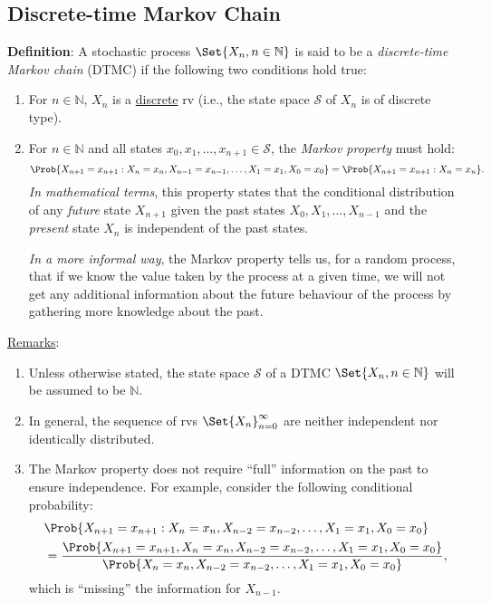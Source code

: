 \subsection*{Discrete-time Markov Chain}
\begin{Regular}
    \textbf{Definition}: A stochastic process $ \Set{X_n,n\in\mathbb{N}} $ is said to be a
    \emph{discrete-time Markov chain} (DTMC) if the following two conditions hold true:
    \begin{enumerate}[(1)]
        \item For $ n\in\mathbb{N} $, $ X_n $ is a \underline{discrete} rv (i.e., the state space $ \mathcal{S} $ of $ X_n $ is of discrete type).
        \item For $ n\in\mathbb{N} $ and all states $ x_0,x_1,\ldots,x_{n+1}\in\mathcal{S} $, the \emph{Markov property} must hold:
              \[ \Prob{X_{n+1}=x_{n+1}\given X_n=x_n,X_{n-1}=x_{n-1},\ldots,X_1=x_1,X_0=x_0}=\Prob{X_{n+1}=x_{n+1}\given X_n=x_n}. \]
              \emph{In mathematical terms}, this property states that the conditional distribution of any \emph{future}
              state $ X_{n+1} $ given the past states $ X_0,X_1,\ldots,X_{n-1} $ and the \emph{present} state $ X_n $ is
              independent of the past states.

              \emph{In a more informal way}, the Markov property tells us, for a random process, that if we
              know the value taken by the process at a given time, we will not get any additional
              information about the future behaviour of the process by gathering more knowledge about
              the past.
    \end{enumerate}
    \tcblower{}
    \underline{Remarks}:
    \begin{enumerate}[(1)]
        \item Unless otherwise stated, the state space $ \mathcal{S} $ of a DTMC $ \Set{X_n,n\in\mathbb{N}} $ will be assumed to be $ \mathbb{N} $.
        \item In general, the sequence of rvs $ \Set{X_n}_{n=0}^\infty $ are neither independent nor identically distributed.
        \item The Markov property does not require ``full'' information on the past to ensure
              independence. For example, consider the following conditional probability:
              \begin{align*}
                   & \Prob{X_{n+1}=x_{n+1} \given X_{n}=x_{n}, X_{n-2}=x_{n-2}, \ldots, X_{1}=x_{1}, X_{0}=x_{0}}                                                                           \\
                   & =\frac{\Prob{X_{n+1}=x_{n+1}, X_{n}=x_{n}, X_{n-2}=x_{n-2}, \ldots, X_{1}=x_{1}, X_{0}=x_{0}}}{\Prob{X_{n}=x_{n}, X_{n-2}=x_{n-2}, \ldots, X_{1}=x_{1}, X_{0}=x_{0}}},
              \end{align*}
              which is ``missing'' the information for $ X_{n-1} $.


\end{enumerate}
\end{Regular}
